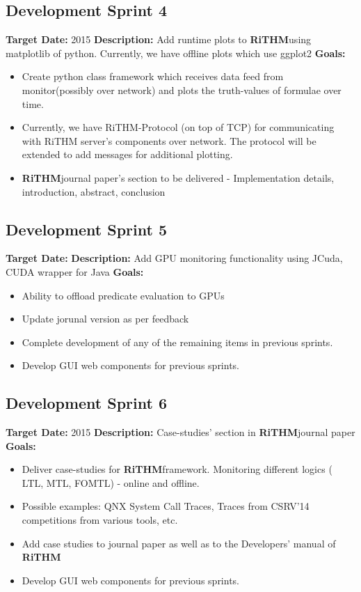 \documentclass[]{article}
\newcommand{\rithm}{\textbf{RiTHM}\space}
\begin{document}
\subsection{Development Sprint 4}
\textbf{Target Date:}\space {} {2015}\newline
\textbf{Description:} Add runtime plots to \rithm using matplotlib of python. Currently, we have offline plots which use ggplot2 \newline
\textbf{Goals:}
\begin{itemize}
	\item
	Create python class framework which receives data feed from monitor(possibly over network) and plots the truth-values of formulae over time.
	\item
	Currently, we have RiTHM-Protocol (on top of TCP) for communicating with RiTHM server's components over network. The protocol will be extended to add messages for additional plotting.
	\item
	\rithm journal paper's section to be delivered - Implementation details, introduction, abstract, conclusion
\end{itemize}


\subsection{Development Sprint 5}
\textbf{Target Date:}\space {}\newline
\textbf{Description:} Add GPU monitoring functionality using JCuda, CUDA wrapper for Java \newline
\textbf{Goals:}
\begin{itemize}
	\item
	Ability to offload predicate evaluation to GPUs
	\item
	Update jorunal version as per feedback
	\item
	Complete development of any of the remaining items in previous sprints.
	\item
	Develop GUI web components for previous sprints. 
\end{itemize}

\subsection{Development Sprint 6}
\textbf{Target Date:}\space {} {2015}\newline
\textbf{Description:} Case-studies' section in \rithm journal paper \newline
\textbf{Goals:}
\begin{itemize}
	\item
	Deliver case-studies for \rithm framework. Monitoring different logics ( LTL, MTL, FOMTL) - online and offline.
	\item
	Possible examples: QNX System Call Traces, Traces from CSRV'14 competitions from various tools, etc.
	\item
	Add case studies to journal paper as well as to the Developers' manual of \rithm
	\item
	Develop GUI web components for previous sprints. 
\end{itemize}
\end{document}
